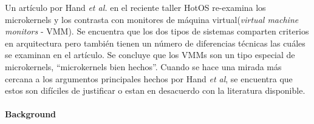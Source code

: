 Un artículo por Hand \emph{et al.} en el reciente taller HotOS re-examina los microkernels y los contrasta con monitores de máquina virtual(\emph{virtual machine monitors} - VMM). Se encuentra que los dos tipos de sistemas comparten criterios en arquitectura pero también tienen un número de diferencias técnicas las cuáles se examinan en el artículo. Se concluye que los VMMs son un tipo especial de microkernels, ``microkernels bien hechos''. Cuando se hace una mirada más cercana a los argumentos principales hechos por Hand \emph{et al}, se encuentra que estos son difíciles de justificar o estan en desacuerdo con la literatura disponible.

\paragraph{\textnormal{\textbf{Background}}}
